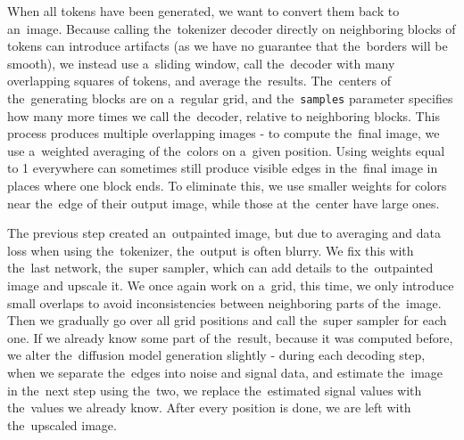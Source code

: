 When all tokens have been generated, we want to convert them back to an~image. Because calling the~tokenizer decoder directly on neighboring blocks of tokens can introduce artifacts (as we have no guarantee that the~borders will be smooth), we instead use a~sliding window, call the~decoder with many overlapping squares of tokens, and average the~results. The~centers of the~generating blocks are on a~regular grid, and the~\texttt{samples} parameter specifies how many more times we call the~decoder, relative to neighboring blocks. This process produces multiple overlapping images - to compute the~final image, we use a~weighted averaging of the~colors on a~given position. Using weights equal to 1 everywhere can sometimes still produce visible edges in the~final image in places where one block ends. To eliminate this, we use smaller weights for colors near the~edge of their output image, while those at the~center have large ones.

The previous step created an~outpainted image, but due to averaging and data loss when using the~tokenizer, the~output is often blurry. We fix this with the~last network, the~super sampler, which can add details to the~outpainted image and upscale it. We once again work on a~grid, this time, we only introduce small overlaps to avoid inconsistencies between neighboring parts of the~image. Then we gradually go over all grid positions and call the~super sampler for each one. If we already know some part of the~result, because it was computed before, we alter the~diffusion model generation slightly - during each decoding step, when we separate the~edges into noise and signal data, and estimate the~image in the~next step using the~two, we replace the~estimated signal values with the~values we already know. After every position is done, we are left with the~upscaled image.
